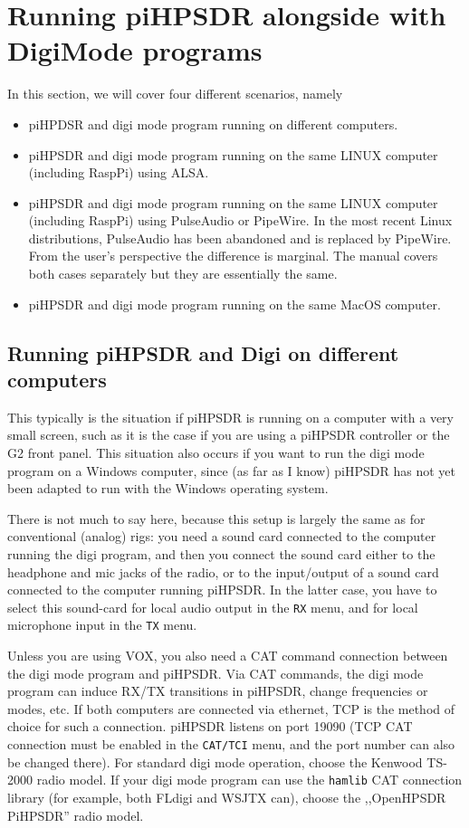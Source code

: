\documentclass[12pt]{book}
\def\bltt#1{\texttt{\color{blue}#1}}
\def\pH{pi\-HPSDR\xspace}
\begin{document}
\chapter[\pH and digi mode programs]{Running \pH alongside with DigiMode programs}

In this section, we will cover four different scenarios, namely
\begin{itemize}
\item{piHPDSR and digi mode program running on different computers.}
\item{\pH and digi mode program running on the same LINUX computer
(including RaspPi) using ALSA.}
\item{\pH and digi mode program running on the same LINUX computer
(including RaspPi) using PulseAudio or PipeWire. {\color{red} In the most recent Linux distributions,
 PulseAudio has been abandoned and is replaced by
PipeWire. From the user's perspective the difference is marginal.
The manual covers both cases separately but they are essentially the same.}}
\item{\pH and digi mode program running on the same MacOS computer.}
\end{itemize}



\section[\pH and Digi on different computers]{Running \pH and Digi on different computers}

This typically is the situation if \pH is running on a computer with a very small
screen, such as it is the case if you are using a \pH controller or the G2 front panel.
This situation also occurs if you want to run the digi mode program on a Windows computer,
since (as far as I know) \pH has not yet been adapted to run with the Windows operating
system.

There is not much to say here, because this setup is largely the same as for conventional
(analog) rigs: you need a sound card connected to the computer running the digi program,
and then you connect the sound card either to the headphone and mic jacks of the radio,
or to the input/output of a sound card connected to the computer running \pH. In the
latter case, you have to select this sound-card for local audio output in the \bltt{RX} menu,
and for local microphone input in the \bltt{TX} menu.

Unless you are using VOX, you also need a CAT command connection between the digi mode program
and \pH. Via CAT commands, the digi mode program can induce RX/TX transitions in \pH,
change frequencies or modes, etc. If both computers are connected via ethernet,
TCP is the method of choice for such a connection. \pH listens on port 19090 (TCP CAT
connection must be enabled in the \bltt{CAT/TCI} menu, and the port number can also
be changed there). For standard digi mode operation, choose the
Kenwood TS-2000 radio model. If your digi mode program can use the \texttt{hamlib} CAT connection
library (for example, both FLdigi and WSJTX can), choose the ,,OpenHPSDR PiHPSDR'' radio
model.
\end{document}
